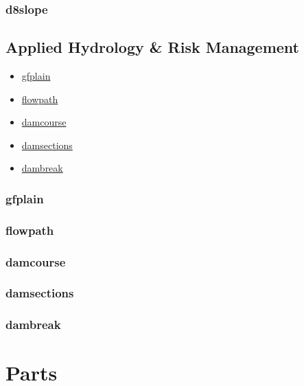\documentclass[
]{book}
\providecommand{\tightlist}{%
  \setlength{\itemsep}{0pt}\setlength{\parskip}{0pt}}
\theoremstyle{definition}
\theoremstyle{definition}
\theoremstyle{definition}
\theoremstyle{definition}
\theoremstyle{remark}
\begin{document}
\subsection{d8slope}\label{d8slope}

\section{Applied Hydrology \& Risk Management}\label{Applied-Hydrology-Risk-Management}

\begin{itemize}
\tightlist
\item
  \hyperref[gfplain]{gfplain}\\
\item
  \hyperref[flowpath]{flowpath}\\
\item
  \hyperref[damcourse]{damcourse}\\
\item
  \hyperref[damsections]{damsections}\\
\item
  \hyperref[dambreak]{dambreak}
\end{itemize}

\subsection{gfplain}\label{gfplain}

\subsection{flowpath}\label{flowpath}

\subsection{damcourse}\label{damcourse}

\subsection{damsections}\label{damsections}

\subsection{dambreak}\label{dambreak}

\chapter{Parts}\label{parts}
\end{document}
